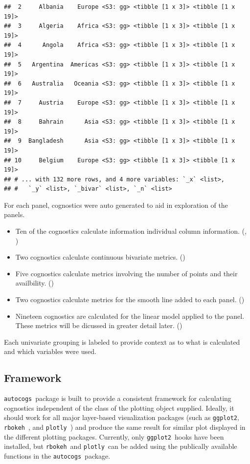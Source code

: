 \documentclass[stat,dissertation]{puthesis}\usepackage[]{graphicx}\usepackage{xcolor}
\makeatletter
\newenvironment{kframe}{%
 \def\at@end@of@kframe{}%
 \ifinner\ifhmode%
  \def\at@end@of@kframe{\end{minipage}}%
  \begin{minipage}{\columnwidth}%
 \fi\fi%
 \def\FrameCommand##1{\hskip\@totalleftmargin \hskip-\fboxsep
 \colorbox{shadecolor}{##1}\hskip-\fboxsep
     \hskip-\linewidth \hskip-\@totalleftmargin \hskip\columnwidth}%
 \MakeFramed {\advance\hsize-\width
   \@totalleftmargin\z@ \linewidth\hsize
   \@setminipage}}%
 {\par\unskip\endMakeFramed%
 \at@end@of@kframe}
\newenvironment{knitrout}{}{} %
\renewenvironment{knitrout}{\setstretch{1}}{}
\newcommand{\pkg}[1]{\texttt{#1}}
\newcommand{\ggplot}{\pkg{ggplot2}}
\newcommand{\autocogs}{\pkg{autocogs}}
\makeatother
\begin{document}
\begin{knitrout}
\begin{kframe}
\begin{verbatim}
##  2     Albania    Europe <S3: gg> <tibble [1 x 3]> <tibble [1 x 19]>
##  3     Algeria    Africa <S3: gg> <tibble [1 x 3]> <tibble [1 x 19]>
##  4      Angola    Africa <S3: gg> <tibble [1 x 3]> <tibble [1 x 19]>
##  5   Argentina  Americas <S3: gg> <tibble [1 x 3]> <tibble [1 x 19]>
##  6   Australia   Oceania <S3: gg> <tibble [1 x 3]> <tibble [1 x 19]>
##  7     Austria    Europe <S3: gg> <tibble [1 x 3]> <tibble [1 x 19]>
##  8     Bahrain      Asia <S3: gg> <tibble [1 x 3]> <tibble [1 x 19]>
##  9  Bangladesh      Asia <S3: gg> <tibble [1 x 3]> <tibble [1 x 19]>
## 10     Belgium    Europe <S3: gg> <tibble [1 x 3]> <tibble [1 x 19]>
## # ... with 132 more rows, and 4 more variables: `_x` <list>,
## #   `_y` <list>, `_bivar` <list>, `_n` <list>
\end{verbatim}
\end{kframe}
\end{knitrout}

For each panel,  cognostics were auto generated to aid in exploration of the panels.

  \begin{itemize}
    \item Ten of the cognostics calculate information individual column information. (, )
    \item Two cognostics calculate continuous bivariate metrics. ()
    \item Five cognostics calculate metrics involving the number of points and their availbility. ()
    \item Two cognostics calculate metrics for the smooth line added to each panel. ()
    \item Nineteen cognostics are calculated for the linear model applied to the panel.  These metrics will be dicussed in greater detail later. ()
  \end{itemize}

Each univariate grouping is labeled to provide context as to what is calculated and which variables were used.


\subsection{Framework}

\autocogs~package is built to provide a consistent framework for calculating cognostics independent of the class of the plotting object supplied.  Ideally, it should work for all major layer-based visualization packages (such as \ggplot, \pkg{rbokeh}~\cite{r_bokeh}, and \pkg{plotly}~\cite{r_plotly}) and produce the same result for similar plot displayed in the different plotting packages.  Currently, only \ggplot~hooks have been installed, but \pkg{rbokeh}~and \pkg{plotly}~can be added using the publically available functions in the \autocogs~package.
\end{document}
